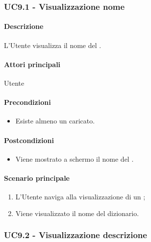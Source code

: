 
\subsubsection{UC9.1 - Visualizzazione nome }\label{UC9point1}
\paragraph*{Descrizione}
L’Utente visualizza il nome del .

\paragraph*{Attori principali}
Utente

\paragraph*{Precondizioni}
\begin{itemize}
  \item Esiste almeno un  caricato.
\end{itemize}

\paragraph*{Postcondizioni}
\begin{itemize}
  \item Viene mostrato a schermo il nome del .
\end{itemize}

\paragraph*{Scenario principale}
\begin{enumerate}
  \item L’Utente naviga alla visualizzazione di un ;
  \item Viene visualizzato il nome del dizionario.  
\end{enumerate}


\subsubsection{UC9.2 - Visualizzazione descrizione }\label{UC9point2}
